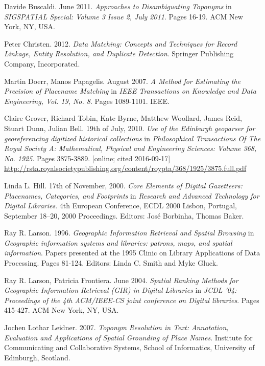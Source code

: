 \documentclass[11pt]{article}
\begin{document}
\begin{thebibliography}{9}
  Davide Buscaldi. June 2011. \emph{Approaches to Disambiguating Toponyms} in \emph{SIGSPATIAL Special: Volume 3 Issue 2, July 2011}. Pages 16-19. ACM New York, NY, USA.
  
  Peter Christen. 2012. \emph{Data Matching: Concepts and Techniques for Record Linkage, Entity Resolution, and Duplicate Detection}. Springer Publishing Company, Incorporated.
  
  Martin Doerr, Manos Papagelis. August 2007. \emph{A Method for Estimating the Precision of Placename Matching} in \emph{IEEE Transactions on Knowledge and Data Engineering, Vol. 19, No. 8}. Pages 1089-1101. IEEE.
  
  Claire Grover, Richard Tobin, Kate Byrne, Matthew Woollard, James Reid, Stuart Dunn, Julian Bell. 19th of July, 2010. \emph{Use of the Edinburgh geoparser for georeferencing digitized historical collections} in \emph{Philosophical Transactions Of The Royal Society A: Mathematical, Physical and Engineering Sciences: Volume 368, No. 1925}. Pages 3875-3889. [online; cited 2016-09-17] \url{http://rsta.royalsocietypublishing.org/content/roypta/368/1925/3875.full.pdf}
  
  Linda L. Hill. 17th of November, 2000. \emph{Core Elements of Digital Gazetteers: Placenames,
Categories, and Footprints} in \emph{Research and Advanced Technology for Digital Libraries}. 4th European Conference, ECDL 2000 Lisbon, Portugal, September 18–20, 2000 Proceedings. Editors: José Borbinha, Thomas Baker.

  Ray R. Larson. 1996. \emph{Geographic Information Retrieval and Spatial Browsing} in \emph{Geographic information systems and libraries: patrons, maps, and spatial information}. Papers presented at the 1995 Clinic on Library Applications of Data Processing. Pages 81-124. Editors: Linda C. Smith and Myke Gluck.
  
  Ray R. Larson, Patricia Frontiera. June 2004. \emph{Spatial Ranking Methods for Geographic Information Retrieval (GIR) in Digital Libraries} in \emph{JCDL '04: Proceedings of the 4th ACM/IEEE-CS joint conference on Digital libraries}. Pages 415-427. ACM New York, NY, USA.

  Jochen Lothar Leidner. 2007. \emph{Toponym Resolution in Text: Annotation, Evaluation and Applications of Spatial Grounding of Place Names}. Institute for Communicating and Collaborative Systems, School of Informatics, University of Edinburgh, Scotland.
  

\end{thebibliography}
\end{document}
